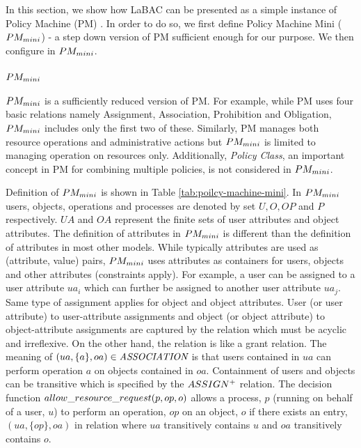 \label{sec:pm}


In this section, we show how LaBAC can be presented as a simple instance of Policy Machine (PM) \cite{policy-machine}. In order to do so, we first define Policy Machine Mini ($PM_{mini}{}$) - a step down version of PM sufficient enough for our purpose. We then configure \hlabac{} in $PM_{mini}{}$.

\subsubsection{$PM_{mini}{}$}

$PM_{mini}{}$ is a sufficiently reduced version of PM.  For example, while PM uses four basic relations namely Assignment, Association, Prohibition and Obligation, $PM_{mini}$ includes only the first two of these. Similarly, PM manages both resource operations and administrative actions but $PM_{mini}$ is limited to managing operation on resources only.  Additionally, \textit{Policy Class}, an important concept in PM for combining multiple policies, is not considered in $PM_{mini}$. 




Definition of $PM_{mini}{}$ is shown in Table \ref{tab:poilcy-machine-mini}. In $PM_{mini}{}$ users, objects, operations and processes are denoted by set $U, O, OP$ and $P$ respectively. $UA$ and $OA$ represent the finite sets of user attributes and object attributes. The definition of attributes in $PM_{mini}$ is different than the definition of attributes in most other models. While typically attributes are used as (attribute, value) pairs, $PM_{mini}$ uses attributes  as containers for users, objects and other attributes (constraints apply). For example, a user can be assigned to a user attribute $ua_i$ which can further be assigned to another user attribute $ua_j$. Same type of assignment applies for object and object attributes. User (or user attribute) to user-attribute  assignments and object (or object attribute) to object-attribute assignments are captured by the \textit{\assignment}{} relation which must be acyclic and irreflexive. On the other hand, the \textit{\association}{} relation is like a grant relation. The meaning of $(ua,\{a\},oa) \in \textit{ASSOCIATION}$ is that users contained in $ua$ can perform operation $a$ on objects contained in $oa$. Containment of users and objects can be transitive which is specified by the $ASSIGN^+{}$ relation. The decision function  $allow\_resource\_request(p,op,o)$ allows a process, $p$ (running on behalf of a user, $u$) to perform an operation, $op$ on an object, $o$ if there exists an entry, $(ua,\{op\},oa)$ in \textit{\association}{} relation  where $ua$ transitively contains $u$ and $oa$ transitively contains $o$.

